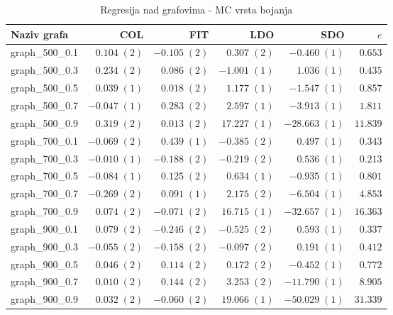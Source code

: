 \documentclass[times, utf8, diplomski, numeric]{fer}
\begin{document}
\begin{table}[htb]
	\caption{Regresija nad grafovima - MC vrsta bojanja}
	\label{tbl:regresija-MC}
	\centering
	\begin{tabular}{|l|r|r|r|r|r|} \hline
	Naziv grafa & COL & FIT & LDO & SDO & $e$ \\ \hline \hline
graph\_500\_0.1 & $ 0.104\; (2) $ & $ -0.105\; (2) $ & $ 0.307\; (2) $ & $ -0.460\; (1) $ & $ 0.653 $\\ \hline
graph\_500\_0.3 & $ 0.234\; (2) $ & $ 0.086\; (2) $ & $ -1.001\; (1) $ & $ 1.036\; (1) $ & $ 0.435 $\\ \hline
graph\_500\_0.5 & $ 0.039\; (1) $ & $ 0.018\; (2) $ & $ 1.177\; (1) $ & $ -1.547\; (1) $ & $ 0.857 $\\ \hline
graph\_500\_0.7 & $ -0.047\; (1) $ & $ 0.283\; (2) $ & $ 2.597\; (1) $ & $ -3.913\; (1) $ & $ 1.811 $\\ \hline
graph\_500\_0.9 & $ 0.319\; (2) $ & $ 0.013\; (2) $ & $ 17.227\; (1) $ & $ -28.663\; (1) $ & $ 11.839 $\\ \hline
graph\_700\_0.1 & $ -0.069\; (2) $ & $ 0.439\; (1) $ & $ -0.385\; (2) $ & $ 0.497\; (1) $ & $ 0.343 $\\ \hline
graph\_700\_0.3 & $ -0.010\; (1) $ & $ -0.188\; (2) $ & $ -0.219\; (2) $ & $ 0.536\; (1) $ & $ 0.213 $\\ \hline
graph\_700\_0.5 & $ -0.084\; (1) $ & $ 0.125\; (2) $ & $ 0.634\; (1) $ & $ -0.935\; (1) $ & $ 0.801 $\\ \hline
graph\_700\_0.7 & $ -0.269\; (2) $ & $ 0.091\; (1) $ & $ 2.175\; (2) $ & $ -6.504\; (1) $ & $ 4.853 $\\ \hline
graph\_700\_0.9 & $ 0.074\; (2) $ & $ -0.071\; (2) $ & $ 16.715\; (1) $ & $ -32.657\; (1) $ & $ 16.363 $\\ \hline
graph\_900\_0.1 & $ 0.079\; (2) $ & $ -0.246\; (2) $ & $ -0.525\; (2) $ & $ 0.593\; (1) $ & $ 0.337 $\\ \hline
graph\_900\_0.3 & $ -0.055\; (2) $ & $ -0.158\; (2) $ & $ -0.097\; (2) $ & $ 0.191\; (1) $ & $ 0.412 $\\ \hline
graph\_900\_0.5 & $ 0.046\; (2) $ & $ 0.114\; (2) $ & $ 0.172\; (2) $ & $ -0.452\; (1) $ & $ 0.772 $\\ \hline
graph\_900\_0.7 & $ 0.010\; (2) $ & $ 0.144\; (2) $ & $ 3.253\; (2) $ & $ -11.790\; (1) $ & $ 8.905 $\\ \hline
graph\_900\_0.9 & $ 0.032\; (2) $ & $ -0.060\; (2) $ & $ 19.066\; (1) $ & $ -50.029\; (1) $ & $ 31.339 $\\ \hline
	\end{tabular}
\end{table} 
\end{document}
